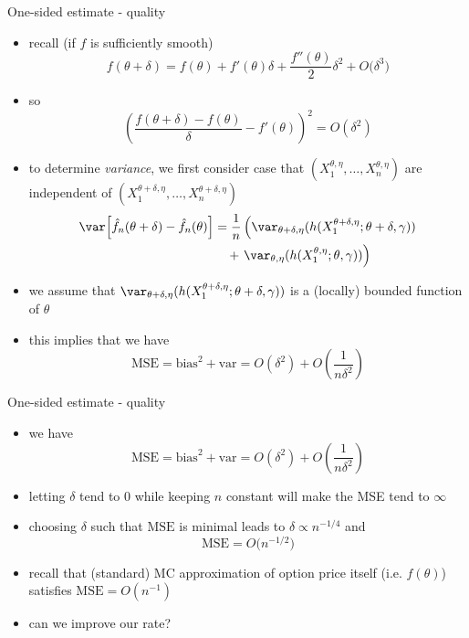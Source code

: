 \documentclass[pdf, handout]{beamer}
\begin{document}
\begin{frame}{One-sided estimate - quality}
\begin{itemize}
\item recall (if $f$ is sufficiently smooth)
\[
f(\theta+\delta) = f(\theta) + f'(\theta)\delta+\frac{f''(\theta)}{2}\delta^2 +O\big(\delta^3\big)
\]
\item so
\[
\left( \frac{f(\theta+\delta)-f(\theta)}{\delta}
-f'(\theta) \right)^2 = O(\delta^2)
\]
\item to determine  \emph{variance}, we first consider case  that
$(X_1^{\theta,\eta},\dots,X_n^{\theta,\eta})$ are independent of
$(X_1^{\theta+\delta,\eta},\dots,X_n^{\theta+\delta,\eta})$
\begin{align*}
 \var\!\left[
  \hat f_n(\theta+\delta) -  \hat f_n(\theta)
\right]
 &= \frac{1}{n} \left( \var_{\theta+\delta,\eta}(
h(X_1^{\theta+\delta,\eta};\theta+\delta,\gamma))
 \right. \\
&\quad +\left.\var_{\theta,\eta}(
h(X_1^{\theta,\eta};\theta,\gamma))\right)
\end{align*}
\item we assume that $ \var_{\theta+\delta,\eta}(
h(X_1^{\theta+\delta,\eta};\theta+\delta,\gamma))$ is a (locally) bounded function of $\theta$
\item this implies that we have
\[
\text{MSE}  = \text{bias}^2 + \text{var} =O(\delta^2)  +  O\left(\frac{1}{n\delta^2}\right)
\]
\end{itemize}
\end{frame}

\begin{frame}{One-sided estimate - quality}
\begin{itemize}
\item we have
\[
\text{MSE}  = \text{bias}^2 + \text{var} = O( \delta^2)  + O\left( \frac{1}{n\delta^2} \right)
\]
\item letting $\delta$ tend to $0$ while keeping $n$ constant will make the MSE
tend to $\infty$
\item choosing $\delta$ such that $\text{MSE}$ is minimal
leads to $\delta \propto n^{-1/4}$ and
$$
\text{MSE} = O\big(n^{-1/2}\big)
$$
\item recall that (standard) MC approximation of option price itself (i.e. $f(\theta)$) satisfies
$\text{MSE} = O(n^{-1})$
\item can we improve our rate?
\end{itemize}
\end{frame}
\end{document}
